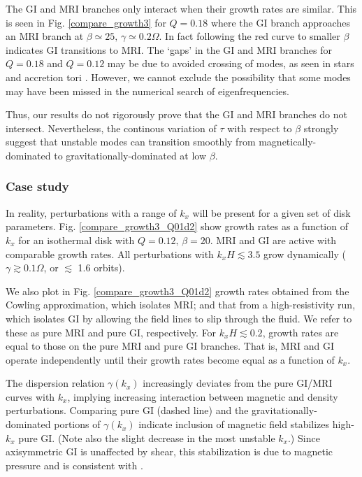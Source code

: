 The GI and MRI branches only interact when their growth rates
are similar. This is seen in Fig. \ref{compare_growth3} for $Q=0.18$
where the GI branch approaches an MRI branch at $\beta\simeq 25,\,
\gamma\simeq 0.2\Omega$. In fact following the red curve to smaller
$\beta$ indicates GI transitions to MRI. The
`gaps' in the GI and MRI branches for $Q=0.18$ and $Q=0.12$ may be due
to avoided crossing of modes, as seen in stars
\citep[e.g.][]{aizenman77} and accretion tori 
\citep[e.g.][]{christo93}. However, we cannot exclude the possibility 
that some modes may have been missed in the numerical search of
eigenfrequencies.  

Thus, our results do not rigorously prove that the GI and MRI branches
do not intersect.  Nevertheless, the continous variation of $\tau$ with
respect to $\beta$ strongly suggest that unstable modes can transition
smoothly from magnetically-dominated to gravitationally-dominated at
low $\beta$.    

\subsubsection{Case study} 
In reality, perturbations with a range of $k_x$ will be present for a
given set of disk parameters. Fig. \ref{compare_growth3_Q01d2} show
growth rates as a function of $k_x$ for an isothermal disk with
$Q=0.12,\,\beta=20$. MRI and GI are active with comparable growth
rates. All perturbations with $k_xH \lesssim 3.5$ grow dynamically
($\gamma\gtrsim 0.1\Omega$, or $\lesssim$ 1.6 orbits).    

We also plot in Fig. \ref{compare_growth3_Q01d2} growth rates obtained 
from the Cowling approximation, which isolates MRI; and that from a
high-resistivity run, which isolates GI by allowing the field lines to
slip through the fluid. We refer to these as  
pure MRI and pure GI, respectively. 
For $k_xH\lesssim 0.2$, growth rates are equal to
those on the pure MRI and pure GI branches. That is, MRI and GI
operate independently until their growth rates become equal as a
function of $k_x$. 

The dispersion relation $\gamma(k_x)$ increasingly deviates from the
pure GI/MRI curves with $k_x$, implying increasing interaction between
magnetic and density perturbations. 
Comparing pure GI (dashed line)  and the gravitationally-dominated
portions of $\gamma(k_x)$ indicate inclusion of magnetic field
stabilizes high-$k_x$ pure GI. (Note also the slight decrease in the most unstable
$k_x$.) Since axisymmetric GI is unaffected by shear, this
stabilization is due to magnetic pressure and is consistent with
\citep{lizano10}.  

